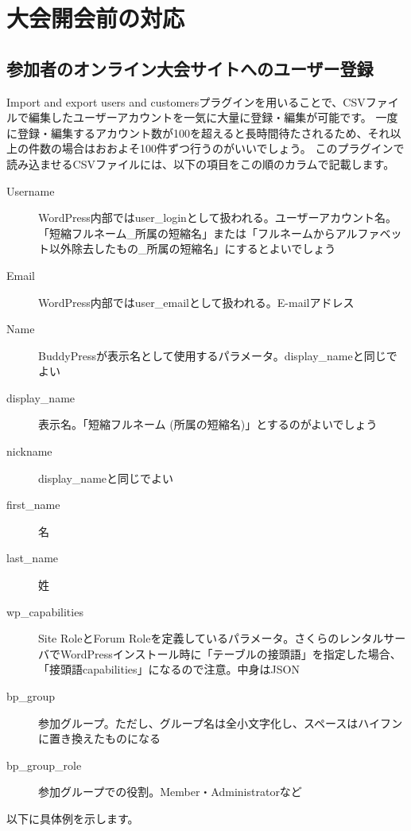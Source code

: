 \documentclass[titlepage,10pt,a4paper,uplatex]{jsbook}
\begin{document}
\section{大会開会前の対応}

\subsection{参加者のオンライン大会サイトへのユーザー登録}

Import and export users and customersプラグインを用いることで、CSVファイルで編集したユーザーアカウントを一気に大量に登録・編集が可能です。
一度に登録・編集するアカウント数が100を超えると長時間待たされるため、それ以上の件数の場合はおおよそ100件ずつ行うのがいいでしょう。
このプラグインで読み込ませるCSVファイルには、以下の項目をこの順のカラムで記載します。

\begin{description}
\item[Username] WordPress内部ではuser\_loginとして扱われる。ユーザーアカウント名。「短縮フルネーム\_所属の短縮名」または「フルネームからアルファベット以外除去したもの\_所属の短縮名」にするとよいでしょう
\item[Email] WordPress内部ではuser\_emailとして扱われる。E-mailアドレス
\item[Name] BuddyPressが表示名として使用するパラメータ。display\_nameと同じでよい
\item[display\_name] 表示名。「短縮フルネーム (所属の短縮名)」とするのがよいでしょう
\item[nickname] display\_nameと同じでよい
\item[first\_name] 名
\item[last\_name] 姓
\item[wp\_capabilities] Site RoleとForum Roleを定義しているパラメータ。さくらのレンタルサーバでWordPressインストール時に「テーブルの接頭語」を指定した場合、「接頭語capabilities」になるので注意。中身はJSON
\item[bp\_group] 参加グループ。ただし、グループ名は全小文字化し、スペースはハイフンに置き換えたものになる
\item[bp\_group\_role] 参加グループでの役割。Member・Administratorなど
\end{description}

以下に具体例を示します。
\end{document}
